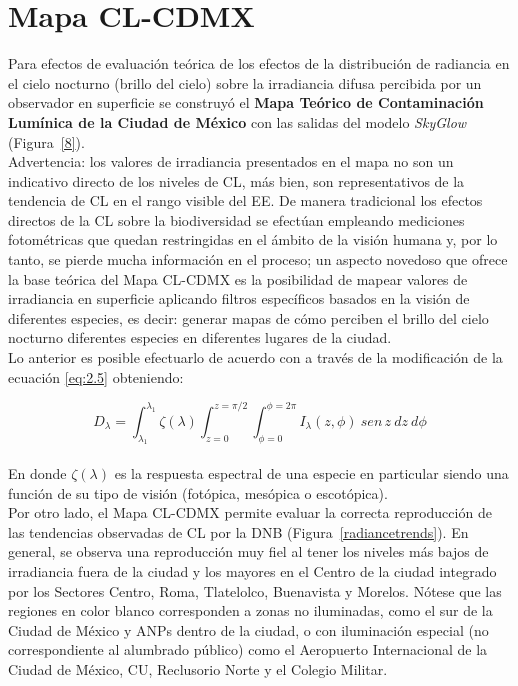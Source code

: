 \newpage

\section{Mapa CL-CDMX}
\label{sec:mapacl}

Para efectos de evaluación teórica de los efectos de la distribución de radiancia en el cielo nocturno (brillo del cielo) sobre la irradiancia difusa percibida por un observador en superficie se construyó el \textbf{Mapa Teórico de Contaminación Lumínica de la Ciudad de México} con las salidas del modelo \textit{SkyGlow} (Figura~\ref{8}).\\

Advertencia: los valores de irradiancia presentados en el mapa no son un indicativo directo de los niveles de CL, más bien, son representativos de la tendencia de CL en el rango visible del EE. De manera tradicional los efectos directos de la CL sobre la biodiversidad se efectúan empleando mediciones fotométricas que quedan restringidas en el ámbito de la visión humana y, por lo tanto, se pierde mucha información en el proceso; un aspecto novedoso que ofrece la base teórica del Mapa CL-CDMX es la posibilidad de mapear valores de irradiancia en superficie aplicando filtros específicos basados en la visión de diferentes especies, es decir: generar mapas de cómo perciben el brillo del cielo nocturno diferentes especies en diferentes lugares de la ciudad.\\

Lo anterior es posible efectuarlo de acuerdo con \cite{Solano2013} a través de la modificación de la ecuación \ref{eq:2.5} obteniendo:

\begin{equation}
D_{\lambda} = \int_{\lambda_{1}}^{\lambda_{1}} \zeta(\lambda) \int_{z = 0}^{z =\pi/2} \int_{\phi = 0}^{\phi = 2\pi} I_{\lambda} (z, \phi) \: sen \,z \: dz \: d\phi
\end{equation}\\


En donde $\zeta(\lambda)$ es la respuesta espectral de una especie en particular siendo una función de su tipo de visión (fotópica, mesópica o escotópica).\\

Por otro lado, el Mapa CL-CDMX permite evaluar la correcta reproducción de las tendencias observadas de CL por la DNB (Figura~\ref{radiancetrends}). En general, se observa una reproducción muy fiel al tener los niveles más bajos de irradiancia fuera de la ciudad y los mayores en el Centro de la ciudad integrado por los Sectores Centro, Roma, Tlatelolco, Buenavista y Morelos. Nótese que las regiones en color blanco corresponden a zonas no iluminadas, como el sur de la Ciudad de México y ANPs dentro de la ciudad, o con iluminación especial (no correspondiente al alumbrado público) como el Aeropuerto Internacional de la Ciudad de México, CU, Reclusorio Norte y el Colegio Militar.\\

